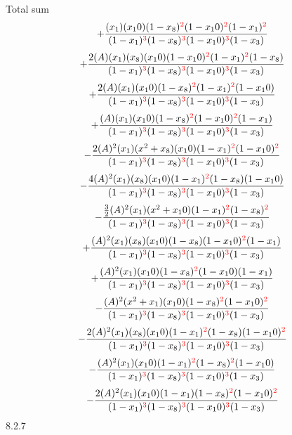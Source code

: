 \documentclass{article}
\begin{document}
Total sum
\[+\frac{(x_1)(x_10)(1-x_8)^{\textcolor{red}{2}}(1-x_10)^{\textcolor{red}{2}}(1-x_1)^{\textcolor{red}{2}}}{(1-x_1)^{\textcolor{red}{3}}(1-x_8)^{\textcolor{red}{3}}(1-x_10)^{\textcolor{red}{3}}(1-x_3)}\]\[+\frac{2(A)(x_1)(x_8)(x_10)(1-x_10)^{\textcolor{red}{2}}(1-x_1)^{\textcolor{red}{2}}(1-x_8)}{(1-x_1)^{\textcolor{red}{3}}(1-x_8)^{\textcolor{red}{3}}(1-x_10)^{\textcolor{red}{3}}(1-x_3)}\]\[+\frac{2(A)(x_1)(x_10)(1-x_8)^{\textcolor{red}{2}}(1-x_1)^{\textcolor{red}{2}}(1-x_10)}{(1-x_1)^{\textcolor{red}{3}}(1-x_8)^{\textcolor{red}{3}}(1-x_10)^{\textcolor{red}{3}}(1-x_3)}\]\[+\frac{(A)(x_1)(x_10)(1-x_8)^{\textcolor{red}{2}}(1-x_10)^{\textcolor{red}{2}}(1-x_1)}{(1-x_1)^{\textcolor{red}{3}}(1-x_8)^{\textcolor{red}{3}}(1-x_10)^{\textcolor{red}{3}}(1-x_3)}\]\[-\frac{2(A)^{2}(x_1)(x^{2}+x_8)(x_10)(1-x_1)^{\textcolor{red}{2}}(1-x_10)^{\textcolor{red}{2}}}{(1-x_1)^{\textcolor{red}{3}}(1-x_8)^{\textcolor{red}{3}}(1-x_10)^{\textcolor{red}{3}}(1-x_3)}\]\[-\frac{4(A)^{2}(x_1)(x_8)(x_10)(1-x_1)^{\textcolor{red}{2}}(1-x_8)(1-x_10)}{(1-x_1)^{\textcolor{red}{3}}(1-x_8)^{\textcolor{red}{3}}(1-x_10)^{\textcolor{red}{3}}(1-x_3)}\]\[-\frac{\frac{3}{2}(A)^{2}(x_1)(x^{2}+x_10)(1-x_1)^{\textcolor{red}{2}}(1-x_8)^{\textcolor{red}{2}}}{(1-x_1)^{\textcolor{red}{3}}(1-x_8)^{\textcolor{red}{3}}(1-x_10)^{\textcolor{red}{3}}(1-x_3)}\]\[+\frac{(A)^{2}(x_1)(x_8)(x_10)(1-x_8)(1-x_10)^{\textcolor{red}{2}}(1-x_1)}{(1-x_1)^{\textcolor{red}{3}}(1-x_8)^{\textcolor{red}{3}}(1-x_10)^{\textcolor{red}{3}}(1-x_3)}\]\[+\frac{(A)^{2}(x_1)(x_10)(1-x_8)^{\textcolor{red}{2}}(1-x_10)(1-x_1)}{(1-x_1)^{\textcolor{red}{3}}(1-x_8)^{\textcolor{red}{3}}(1-x_10)^{\textcolor{red}{3}}(1-x_3)}\]\[-\frac{(A)^{2}(x^{2}+x_1)(x_10)(1-x_8)^{\textcolor{red}{2}}(1-x_10)^{\textcolor{red}{2}}}{(1-x_1)^{\textcolor{red}{3}}(1-x_8)^{\textcolor{red}{3}}(1-x_10)^{\textcolor{red}{3}}(1-x_3)}\]\[-\frac{2(A)^{2}(x_1)(x_8)(x_10)(1-x_1)^{\textcolor{red}{2}}(1-x_8)(1-x_10)^{\textcolor{red}{2}}}{(1-x_1)^{\textcolor{red}{3}}(1-x_8)^{\textcolor{red}{3}}(1-x_10)^{\textcolor{red}{3}}(1-x_3)}\]\[-\frac{(A)^{2}(x_1)(x_10)(1-x_1)^{\textcolor{red}{2}}(1-x_8)^{\textcolor{red}{2}}(1-x_10)}{(1-x_1)^{\textcolor{red}{3}}(1-x_8)^{\textcolor{red}{3}}(1-x_10)^{\textcolor{red}{3}}(1-x_3)}\]\[-\frac{2(A)^{2}(x_1)(x_10)(1-x_1)(1-x_8)^{\textcolor{red}{2}}(1-x_10)^{\textcolor{red}{2}}}{(1-x_1)^{\textcolor{red}{3}}(1-x_8)^{\textcolor{red}{3}}(1-x_10)^{\textcolor{red}{3}}(1-x_3)}\]
8.2.7
\end{document}
